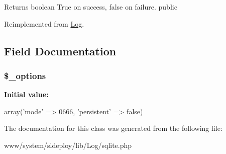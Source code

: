\begin{DoxyReturn}{Returns}
boolean True on success, false on failure.  public 
\end{DoxyReturn}


Reimplemented from \hyperlink{class_log_a44a2ac59a3b91f8c18905dce700934d6}{Log}.



\subsection{Field Documentation}
\hypertarget{class_log__sqlite_a1bebdc689c84eee59ad24c77e5531762}{
\subsubsection[{\$\_\-options}]{\setlength{\rightskip}{0pt plus 5cm}\$\_\-options}}
\label{class_log__sqlite_a1bebdc689c84eee59ad24c77e5531762}
{\bfseries Initial value:}
\begin{DoxyCode}
 array('mode'       => 0666,
                          'persistent' => false)
\end{DoxyCode}


The documentation for this class was generated from the following file:\begin{DoxyCompactItemize}
\item 
www/system/sldeploy/lib/Log/sqlite.php\end{DoxyCompactItemize}
